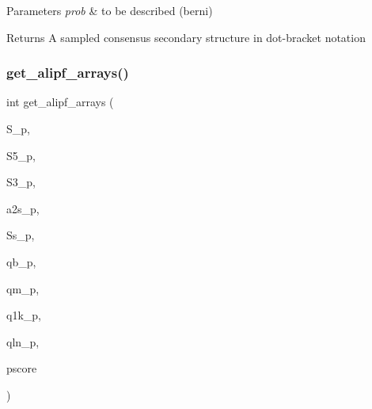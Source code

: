 \begin{DoxyParams}{Parameters}
{\em prob} & to be described (berni) \\
\hline
\end{DoxyParams}
\begin{DoxyReturn}{Returns}
A sampled consensus secondary structure in dot-\/bracket notation 
\end{DoxyReturn}
\mbox{\label{group__part__func__global__deprecated_ga5349960075b1847720a2e9df021e2675}} 
\subsubsection{\texorpdfstring{get\+\_\+alipf\+\_\+arrays()}{get\_alipf\_arrays()}}
{\footnotesize\ttfamily int get\+\_\+alipf\+\_\+arrays (\begin{DoxyParamCaption}\item[{short $\ast$$\ast$$\ast$}]{S\+\_\+p,  }\item[{short $\ast$$\ast$$\ast$}]{S5\+\_\+p,  }\item[{short $\ast$$\ast$$\ast$}]{S3\+\_\+p,  }\item[{unsigned short $\ast$$\ast$$\ast$}]{a2s\+\_\+p,  }\item[{char $\ast$$\ast$$\ast$}]{Ss\+\_\+p,  }\item[{\hyperlink{group__data__structures_ga31125aeace516926bf7f251f759b6126}{F\+L\+T\+\_\+\+O\+R\+\_\+\+D\+BL} $\ast$$\ast$}]{qb\+\_\+p,  }\item[{\hyperlink{group__data__structures_ga31125aeace516926bf7f251f759b6126}{F\+L\+T\+\_\+\+O\+R\+\_\+\+D\+BL} $\ast$$\ast$}]{qm\+\_\+p,  }\item[{\hyperlink{group__data__structures_ga31125aeace516926bf7f251f759b6126}{F\+L\+T\+\_\+\+O\+R\+\_\+\+D\+BL} $\ast$$\ast$}]{q1k\+\_\+p,  }\item[{\hyperlink{group__data__structures_ga31125aeace516926bf7f251f759b6126}{F\+L\+T\+\_\+\+O\+R\+\_\+\+D\+BL} $\ast$$\ast$}]{qln\+\_\+p,  }\item[{short $\ast$$\ast$}]{pscore }\end{DoxyParamCaption})}



